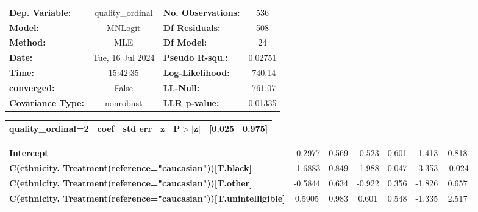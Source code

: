 \begin{center}
\begin{tabular}{lclc}
\toprule
\textbf{Dep. Variable:}                                                   & quality\_ordinal & \textbf{  No. Observations:  } &      536    \\
\textbf{Model:}                                                           &     MNLogit      & \textbf{  Df Residuals:      } &      508    \\
\textbf{Method:}                                                          &       MLE        & \textbf{  Df Model:          } &       24    \\
\textbf{Date:}                                                            & Tue, 16 Jul 2024 & \textbf{  Pseudo R-squ.:     } &  0.02751    \\
\textbf{Time:}                                                            &     15:42:35     & \textbf{  Log-Likelihood:    } &   -740.14   \\
\textbf{converged:}                                                       &      False       & \textbf{  LL-Null:           } &   -761.07   \\
\textbf{Covariance Type:}                                                 &    nonrobust     & \textbf{  LLR p-value:       } &  0.01335    \\
\bottomrule
\end{tabular}
\begin{tabular}{ccccccc}
                       \textbf{quality\_ordinal=2}                        & \textbf{coef} & \textbf{std err} & \textbf{z} & \textbf{P$> |$z$|$} & \textbf{[0.025} & \textbf{0.975]}  \\
\midrule
\bottomrule
\end{tabular}
\begin{tabular}{lcccccc}
\textbf{Intercept}                                                        &      -0.2977  &        0.569     &    -0.523  &         0.601        &       -1.413    &        0.818     \\
\textbf{C(ethnicity, Treatment(reference="caucasian"))[T.black]}          &      -1.6883  &        0.849     &    -1.988  &         0.047        &       -3.353    &       -0.024     \\
\textbf{C(ethnicity, Treatment(reference="caucasian"))[T.other]}          &      -0.5844  &        0.634     &    -0.922  &         0.356        &       -1.826    &        0.657     \\
\textbf{C(ethnicity, Treatment(reference="caucasian"))[T.unintelligible]} &       0.5905  &        0.983     &     0.601  &         0.548        &       -1.335    &        2.517     \\

\end{tabular}
\end{center}
